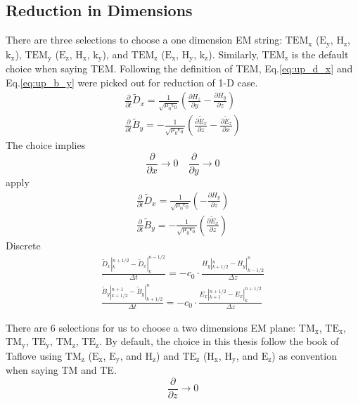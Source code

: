 \subsection{Reduction in Dimensions}
There are three selections to choose a one dimension EM string: $\mathrm{TEM_x}$ ($\mathrm{E_{y}}$, $\mathrm{H_{z}}$,
$\mathrm{k_x}$), $\mathrm{TEM_y}$ ($\mathrm{E_z}$, $\mathrm{H_x}$, $\mathrm{k_y}$), and $\mathrm{TEM_z}$
($\mathrm{E_x}$, $\mathrm{H_y}$, $\mathrm{k_z}$). Similarly, $\mathrm{TEM_z}$ is the default choice when saying
TEM. Following the definition of TEM, Eq.\ref{eq:up_d_x} and Eq.\ref{eq:up_b_y} were picked out for reduction of 1-D
case.
\begin{gather*}
  \frac{\partial}{\partial t}\widetilde{D}_x = \frac{1}{\sqrt{\mu_0\epsilon_0}}\left(\frac{\partial H_z}{\partial y} - \frac{\partial H_y}{\partial z}\right)\\
  \frac{\partial}{\partial t}\widetilde{B}_y =-\frac{1}{\sqrt{\mu_0\epsilon_0}}\left(\frac{\partial \widetilde{E}_x}{\partial z} - \frac{\partial \widetilde{E}_z}{\partial x}\right)
\end{gather*}
The choice implies
\begin{displaymath}
  \frac{\partial}{\partial x} \rightarrow 0\quad
  \frac{\partial}{\partial y} \rightarrow 0
\end{displaymath}
apply
\begin{gather}
  \frac{\partial}{\partial t}\widetilde{D}_x = \frac{1}{\sqrt{\mu_0\epsilon_0}}\left( - \frac{\partial H_y}{\partial z}\right)\\
  \frac{\partial}{\partial t}\widetilde{B}_y =-\frac{1}{\sqrt{\mu_0\epsilon_0}}\left(\frac{\partial \widetilde{E}_x}{\partial z} \right)
\end{gather}
Discrete
\begin{gather}
  \frac{\widetilde{D}_x|_k^{n+1/2} - \widetilde{D}_x|_k^{n-1/2}}{\Delta t} = -c_0\cdot\frac{H_y|_{k+1/2}^n - H_y|_{k-1/2}^n}{\Delta z}\\
  \frac{\widetilde{B}_y|_{k+1/2}^{n+1} - \widetilde{B}_y|_{k+1/2}^n}{\Delta t} = -c_0\cdot\frac{E_x|_{k+1}^{n+1/2} - E_x|_{k}^{n+1/2}}{\Delta z}
\end{gather}




There are 6 selections for us to choose a two dimensions EM plane: $\mathrm{TM_{x}} $, $\mathrm{TE_{x}}$,
$\mathrm{TM_{y}}$, $\mathrm{TE_{y}}$, $\mathrm{TM_{z}}$, $\mathrm{TE_{z}}$. By default, the choice in this thesis follow
the book of Taflove using $\mathrm{TM_{z}}$ ($\mathrm{E_x}$, $\mathrm{E_y}$, and $\mathrm{H_z}$) and $\mathrm{TE_{z}}$
($\mathrm{H_x}$, $\mathrm{H_y}$, and $\mathrm{E_z}$) as convention when saying TM and TE.
\begin{displaymath}
  \frac{\partial}{\partial z} \rightarrow 0
\end{displaymath}



